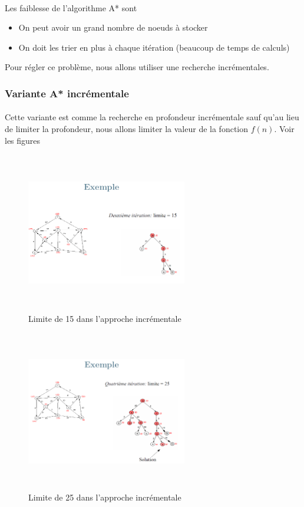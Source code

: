 \documentclass{book}
\begin{document}
\paragraph{}
Les faiblesse de l'algorithme A* sont 
\begin{itemize}
\item On peut avoir un grand nombre de noeuds à stocker
\item On doit les trier en plus à chaque itération (beaucoup de temps de calculs)
\end{itemize}
Pour régler ce problème, nous allons utiliser une recherche incrémentales.
\subsubsection{Variante A* incrémentale}
\paragraph{}
Cette variante est comme la recherche en profondeur incrémentale sauf qu'au lieu de limiter la profondeur, nous allons limiter la valeur de la fonction $f(n)$. Voir les figures 

\begin{figure}[!ht]
\centering
\includegraphics[width = 7cm, height = 7cm, keepaspectratio]{incrementale_15.png}
\caption{Limite de 15 dans l'approche incrémentale}
\label{fig:incrementale15}
\end{figure}

\begin{figure}[!ht]
\centering
\includegraphics[width = 7cm, height = 7cm, keepaspectratio]{incrementale_25.png}
\caption{Limite de 25 dans l'approche incrémentale}
\label{fig:incrementale25}
\end{figure}
\end{document}
